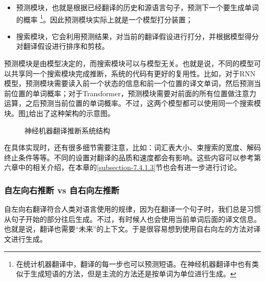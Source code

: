 \begin{itemize}
\vspace{0.5em}
\item 预测模块，也就是根据已经翻译的历史和源语言句子，预测下一个要生成单词的概率 \footnote{在统计机器翻译中，翻译的每一步也可以预测短语。在神经机器翻译中也有类似于生成短语的方法，但是主流的方法还是按单词为单位进行生成。}。因此预测模块实际上就是一个模型打分装置；
\vspace{0.5em}
\item 搜索模块，它会利用预测结果，对当前的翻译假设进行打分，并根据模型得分对翻译假设进行排序和剪枝。
\vspace{0.5em}
\end{itemize}

\parinterval 预测模块是由模型决定的，而搜索模块可以与模型无关。也就是说，不同的模型可以共享同一个搜索模块完成推断，系统的代码有更好的复用性。比如，对于RNN模型，预测模块需要读入前一个状态的信息和前一个位置的译文单词，然后预测当前位置的单词概率；对于Transformer，预测模块需要对前面的所有位置做注意力运算，之后预测当前位置的单词概率。不过，这两个模型都可以使用同一个搜索模块。图\ref{fig:7-19}给出了这种架构的示意图。

\begin{figure}[htp]
\centering

\caption{神经机器翻译推断系统结构}
\label{fig:7-19}
\end{figure}

\parinterval 在具体实现时，还有很多细节需要注意，比如：词汇表大小、束搜索的宽度、解码终止条件等等。不同的设置对翻译的品质和速度都会有影响。这些内容可以参考第六章中的相关介绍，在本章的\ref{subsection-7.4.1.3}节也会有进一步进行讨论。


\subsubsection{自左向右推断 vs 自右向左推断}

\parinterval 自左向右翻译符合人类对语言使用的规律，因为在翻译一个句子时，我们总是习惯从句子开始的部分往后生成。不过，有时候人也会使用当前单词后面的译文信息。也就是说，翻译也需要``未来''的上下文。于是很容易想到使用自右向左的方法对译文进行生成。

